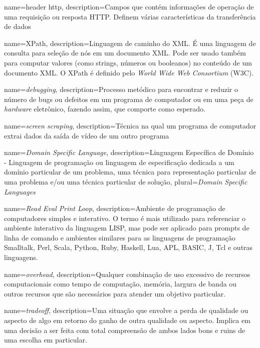 				{name={header http},
				 description={Campos que contém informações de operação de uma requisição ou resposta HTTP. Definem várias características da transferência de dados}
				}

				{name={XPath},
				 description={Linguagem de caminho do XML. É uma linguagem de consulta para seleção de nós em um documento XML. Pode ser usado também para computar valores (como strings, números ou booleanos) no conteúdo de um documento XML. O XPath é definido pelo \emph{World Wide Web Consortium} (W3C).}
				}

				{name={\emph{debugging}},
				 description={Processo metódico para encontrar e reduzir o número de bugs ou defeitos em um programa de computador ou em uma peça de \emph{hardware} eletrônico, fazendo assim, que comporte como esperado.}
				}

				{name={\emph{screen scraping}},
				 description={Técnica na qual um programa de computador extrai dados da saída de vídeo de um outro programa}
				}
				
				{name={\emph{Domain Specific Language}},
				 description={Linguagem Específica de Domínio - Linguagem de programação ou linguagem de especificação dedicada a um domínio particular de um problema, uma técnica para representação particular de uma problema e/ou uma técnica particular de solução},
				 plural={\emph{Domain Specific Languages}}
				}
				
				{name={\emph{Read Eval Print Loop}},
				 description={Ambiente de programação de computadores simples e interativo. O termo é mais utilizado para referenciar o ambiente interativo da linguagem LISP, mas pode ser aplicado para prompts de linha de comando e ambientes similares para as linguagens de programação Smalltalk, Perl, Scala, Python, Ruby, Haskell, Lua, APL, BASIC, J, Tcl e outras linguagens.}
				}

				{name={\emph{overhead}},
				 description={Qualquer combinação de uso excessivo de recursos computacionais como tempo de computação, memória, largura de banda ou outros recursos que são necessários para atender um objetivo particular.}
				}

				{name={\emph{tradeoff}},
				 description={Uma situação que envolve a perda de qualidade ou aspecto de algo em retorno do ganho de outra qualidade ou aspecto. Implica em uma decisão a ser feita com total compreensão de ambos lados bons e ruins de uma escolha em particular.}
				 }